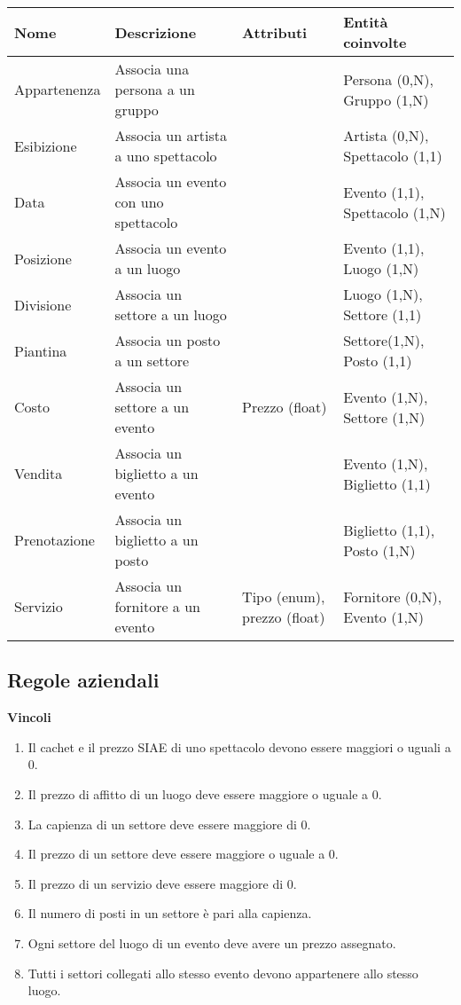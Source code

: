 \documentclass[a4paper,11pt]{article}
\begin{document}
\begin{tabularx}{\textwidth}{|X|>{\raggedright\arraybackslash}X|>{\raggedright\arraybackslash}X|>{\raggedright\arraybackslash}X|}
\hline
\textbf{Nome} & \textbf{Descrizione} & \textbf{Attributi} & \textbf{Entità coinvolte}\\
\hline
Appartenenza & Associa una persona a un gruppo & & Persona (0,N), Gruppo (1,N)\\
\hline
Esibizione & Associa un artista a uno spettacolo & & Artista (0,N), Spettacolo (1,1)\\
\hline
Data & Associa un evento con uno spettacolo & & Evento (1,1), Spettacolo (1,N)\\
\hline
Posizione & Associa un evento a un luogo & & Evento (1,1), Luogo (1,N)\\
\hline
Divisione & Associa un settore a un luogo & & Luogo (1,N), Settore (1,1)\\
\hline
Piantina & Associa un posto a un settore & & Settore(1,N), Posto (1,1)\\
\hline
Costo & Associa un settore a un evento & Prezzo (float) & Evento (1,N), Settore (1,N)\\
\hline
Vendita & Associa un biglietto a un evento & & Evento (1,N), Biglietto (1,1)\\
\hline
Prenotazione & Associa un biglietto a un posto & & Biglietto (1,1), Posto (1,N)\\
\hline
Servizio & Associa un fornitore a un evento & Tipo (enum), prezzo (float) & Fornitore (0,N), Evento (1,N)\\
\hline
\end{tabularx}

\subsection{Regole aziendali}

\textbf{Vincoli}

\begin{enumerate}[label=$\bullet$\hspace{.5em}(RV\arabic*),leftmargin=6em,ref=RV\theenumi]
  \item Il cachet e il prezzo SIAE di uno spettacolo devono essere maggiori o uguali a 0.
  \item Il prezzo di affitto di un luogo deve essere maggiore o uguale a 0.
  \item La capienza di un settore deve essere maggiore di 0.
  \item Il prezzo di un settore deve essere maggiore o uguale a 0.
  \item Il prezzo di un servizio deve essere maggiore di 0.
  \item Il numero di posti in un settore è pari alla capienza.
  \item \label{rv7} Ogni settore del luogo di un evento deve avere un prezzo assegnato.
  \item \label{rv8} Tutti i settori collegati allo stesso evento devono appartenere allo stesso luogo.
\end{enumerate}
\end{document}
